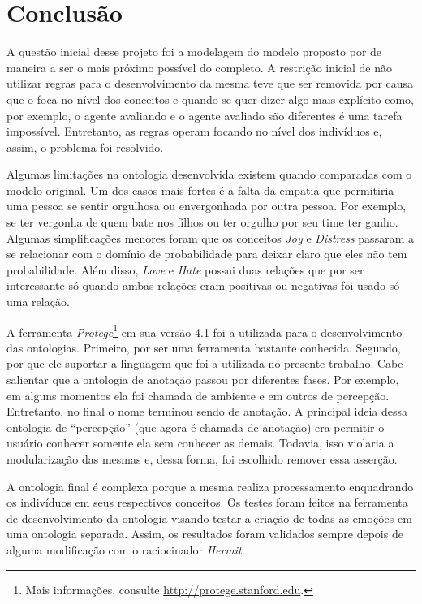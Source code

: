\chapter{Conclusão} \label{cap:c}

A questão inicial desse projeto foi a modelagem do modelo proposto por
\citet{ortony1988cse} de maneira a ser o mais próximo possível do completo. A
restrição inicial de não utilizar regras para o desenvolvimento da mesma teve
que ser removida por causa que o \OWL foca no nível dos conceitos e quando se
quer dizer algo mais explícito como, por exemplo, o agente avaliando e o
agente avaliado são diferentes é uma tarefa impossível. Entretanto, as regras
operam focando no nível dos indivíduos e, assim, o problema foi resolvido.

Algumas limitações na ontologia desenvolvida existem quando comparadas com o
modelo original. Um dos casos mais fortes é a falta da empatia que permitiria
uma pessoa se sentir orgulhosa ou envergonhada por outra pessoa. Por exemplo,
se ter vergonha de quem bate nos filhos ou ter orgulho por seu time ter ganho.
Algumas simplificações menores foram que os conceitos \emph{Joy} e
\emph{Distress} passaram a se relacionar com o domínio de probabilidade para
deixar claro que eles não tem probabilidade. Além disso, \emph{Love} e
\emph{Hate} possui duas relações que por ser interessante só quando ambas
relações eram positivas ou negativas foi usado só uma relação.

A ferramenta \emph{Protege}\footnote{Mais informações, consulte \url{http://protege.stanford.edu}.}
em sua versão 4.1 foi a utilizada para o desenvolvimento das ontologias.
Primeiro, por ser uma ferramenta bastante conhecida. Segundo, por que ele
suportar a linguagem  que foi a utilizada no presente trabalho.
%
Cabe salientar que a ontologia de anotação passou por diferentes fases. Por
exemplo, em alguns momentos ela foi chamada de ambiente e em outros de
percepção. Entretanto, no final o nome terminou sendo de anotação. A principal
ideia dessa ontologia de ``percepção'' (que agora é chamada de anotação) era
permitir o usuário conhecer somente ela sem conhecer as demais. Todavia, isso
violaria a modularização das mesmas e, dessa forma, foi escolhido remover essa
asserção.

A ontologia final é complexa porque a mesma realiza processamento enquadrando
os indivíduos em seus respectivos conceitos. Os testes foram feitos na
ferramenta de desenvolvimento da ontologia visando testar a criação de todas
as emoções em uma ontologia separada. Assim, os resultados foram validados
sempre depois de alguma modificação com o raciocinador \emph{Hermit}.


